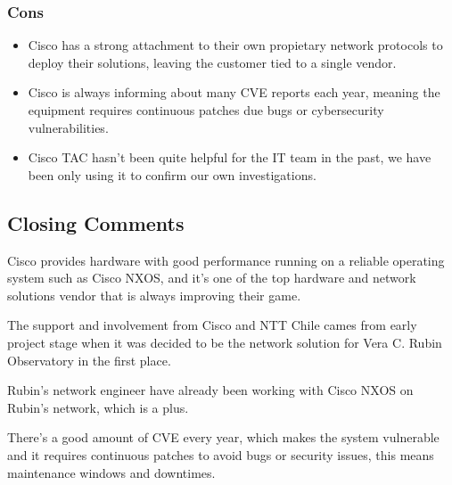   \subsubsection{Cons}
  \begin{itemize}
    \item Cisco has a strong attachment to their own propietary network protocols to deploy their solutions, leaving the customer tied to a single vendor.
    \item Cisco is always informing about many CVE reports each year, meaning the equipment requires continuous patches due bugs or cybersecurity vulnerabilities.
    \item Cisco TAC hasn't been quite helpful for the IT team in the past, we have been only using it to confirm our own investigations.
  \end{itemize}

  \subsection{Closing Comments}
   
   Cisco provides hardware with good performance running on a reliable operating system such as Cisco NXOS, and it's one of the top hardware and network solutions vendor that is always improving their game. 
   
   The support and involvement from Cisco and NTT Chile cames from early project stage when it was decided to be the network solution for Vera C. Rubin Observatory in the first place. 
   
   Rubin's network engineer have already been working with Cisco NXOS on Rubin's network, which is a plus. 
   
   There's a good amount of CVE every year, which makes the system vulnerable and it requires continuous patches to avoid bugs or security issues, this means maintenance windows and downtimes.
   
   
  


